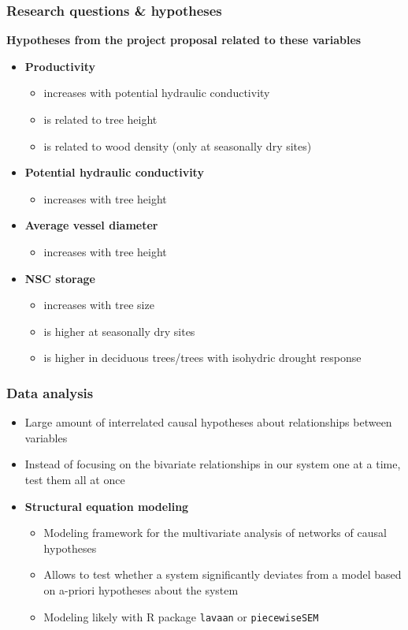 \documentclass[usepdftitle=false]{beamer}
\newcommand{\Blue}[1]{{\color{blue!50!black}\textbf{#1}}}
\newcommand{\Rar}{$\Rightarrow$}
\newenvironment{changemargin}[2]{%
	\begin{list}{}{%
			\setlength{\topsep}{0pt}%
			\setlength{\leftmargin}{#1}%
			\setlength{\rightmargin}{#2}%
			\setlength{\listparindent}{\parindent}%
			\setlength{\itemindent}{\parindent}%
			\setlength{\parsep}{\parskip}%
		}%
		\item[]}
	{\end{list}
}
\begin{document}
\begin{frame}
	\frametitle{Research questions \& hypotheses}
	\begin{changemargin}{-2em}{-2em}
		\Blue{Hypotheses from the project proposal related to these variables}
		\begin{itemize}
			\item \alert<1>{\textbf{Productivity}}
			\begin{itemize}
				\item increases with potential hydraulic conductivity
				\item is related to tree height
				\item is related to wood density (only at seasonally dry sites)
			\end{itemize}
			\item<2-> \alert<2>{\textbf{Potential hydraulic conductivity}}
			\begin{itemize}
				\item increases with tree height
			\end{itemize}
			\item<3-> \alert<3>{\textbf{Average vessel diameter}}
			\begin{itemize}
				\item increases with tree height
			\end{itemize}
			\item<4-> \alert<4>{\textbf{NSC storage}}
			\begin{itemize}
				\item increases with tree size
				\item is higher at seasonally dry sites
				\item is higher in deciduous trees/trees with isohydric drought response
			\end{itemize}
		\end{itemize}
	\end{changemargin}
\end{frame}

\begin{frame}
	\frametitle{Data analysis}
	\begin{itemize}
		\item<+-| alert@+> Large amount of interrelated causal hypotheses about relationships between variables
		\item<+-| alert@+>[\Rar] Instead of focusing on the bivariate relationships in our system one at a time, test them all at once
		\item<visible@+-| alert@+>[\Rar]\textbf{Structural equation modeling}
		\begin{itemize}
			\item Modeling framework for the multivariate analysis of networks of causal hypotheses
			\item Allows to test whether a system significantly deviates from a model based on a-priori hypotheses about the system
			\item Modeling likely with R package \texttt{lavaan} or \texttt{piecewiseSEM}
		\end{itemize}		
	\end{itemize}
\end{frame}
\end{document}
